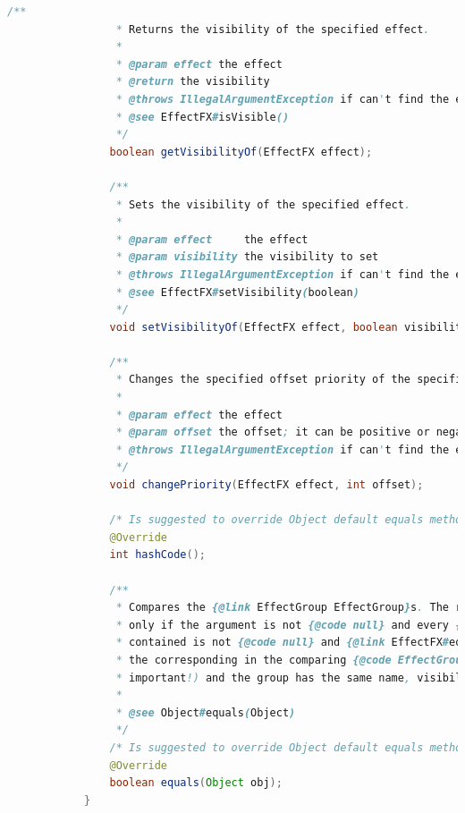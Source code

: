 \begin{lstlisting}[language=Java]
                /**
                 * Returns the visibility of the specified effect.
                 *
                 * @param effect the effect
                 * @return the visibility
                 * @throws IllegalArgumentException if can't find the effect
                 * @see EffectFX#isVisible()
                 */
                boolean getVisibilityOf(EffectFX effect);

                /**
                 * Sets the visibility of the specified effect.
                 *
                 * @param effect     the effect
                 * @param visibility the visibility to set
                 * @throws IllegalArgumentException if can't find the effect
                 * @see EffectFX#setVisibility(boolean)
                 */
                void setVisibilityOf(EffectFX effect, boolean visibility);

                /**
                 * Changes the specified offset priority of the specified offset.
                 *
                 * @param effect the effect
                 * @param offset the offset; it can be positive or negative
                 * @throws IllegalArgumentException if can't find the effect
                 */
                void changePriority(EffectFX effect, int offset);

                /* Is suggested to override Object default equals method. */
                @Override
                int hashCode();

                /**
                 * Compares the {@link EffectGroup EffectGroup}s. The result is true if and
                 * only if the argument is not {@code null} and every {@link EffectFX}
                 * contained is not {@code null} and {@link EffectFX#equals(Object) equal} to
                 * the corresponding in the comparing {@code EffectGroup} (order is
                 * important!) and the group has the same name, visibility and transparency.
                 *
                 * @see Object#equals(Object)
                 */
                /* Is suggested to override Object default equals method. */
                @Override
                boolean equals(Object obj);
            }
        \end{lstlisting}

